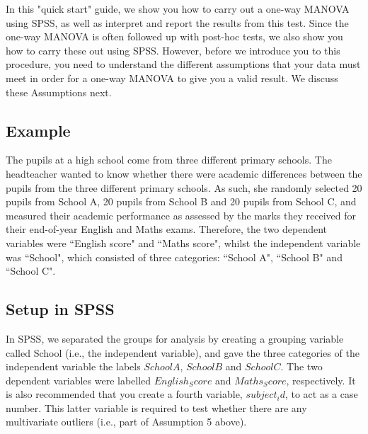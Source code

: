 \documentclass[a4paper,12pt]{article}
\begin{document}
In this "quick start" guide, we show you how to carry out a one-way MANOVA using SPSS, as well as interpret and report the results from this test. Since the one-way MANOVA is often followed up with post-hoc tests, we also show you how to carry these out using SPSS. However, before we introduce you to this procedure, you need to understand the different assumptions that your data must meet in order for a one-way MANOVA to give you a valid result. We discuss these  Assumptions next.



\subsection{Example}
The pupils at a high school come from three different primary schools. The headteacher wanted to know whether there were academic differences between the pupils from the three different primary schools. As such, she randomly selected 20 pupils from School A, 20 pupils from School B and 20 pupils from School C, and measured their academic performance as assessed by the marks they received for their end-of-year English and Maths exams. Therefore, the two dependent variables were ``English score" and ``Maths score", whilst the independent variable was ``School", which consisted of three categories: ``School A", ``School B" and ``School C".



\subsection{Setup in SPSS}
In SPSS, we separated the groups for analysis by creating a grouping variable called School (i.e., the independent variable), and gave the three categories of the independent variable the labels $School A$, $School B$ and $School C$. The two dependent variables were labelled $English_Score$ and $Maths_Score$, respectively. It is also recommended that you create a fourth variable, $subject_id$, to act as a case number. This latter variable is required to test whether there are any multivariate outliers (i.e., part of Assumption 5 above).

\end{document}
